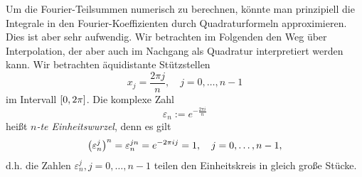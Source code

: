 \documentclass{lecture}
\begin{document}
    \begin{remark}
        Um die Fourier-Teilsummen numerisch zu berechnen, könnte man prinzipiell die Integrale in den Fourier-Koeffizienten durch Quadraturformeln approximieren.
        Dies ist aber sehr aufwendig.
        Wir betrachten im Folgenden den Weg über Interpolation, der aber auch im Nachgang als Quadratur interpretiert werden kann.
        Wir betrachten äquidistante Stützstellen
        \[
            x_j = \frac{2\pi j}{n}, \quad j = 0, \ldots, n - 1
        \]
        im Intervall \(\brackets*{0, 2\pi}\).
        Die komplexe Zahl
        \[
            \varepsilon_n := e^{-\frac{2\pi i}{n}}
        \]
        heißt \emph{\(n\)-te Einheitswurzel}, denn es gilt
        \[
            \parentheses*{\varepsilon_n^j}^n = \varepsilon_n^{jn} = e^{-2\pi ij} = 1, \quad j = 0, \ldots, n - 1,
        \]
        d.h. die Zahlen \(\varepsilon_n^j, j = 0, \ldots, n - 1\) teilen den Einheitskreis in gleich große Stücke.
    \end{remark}
\end{document}
